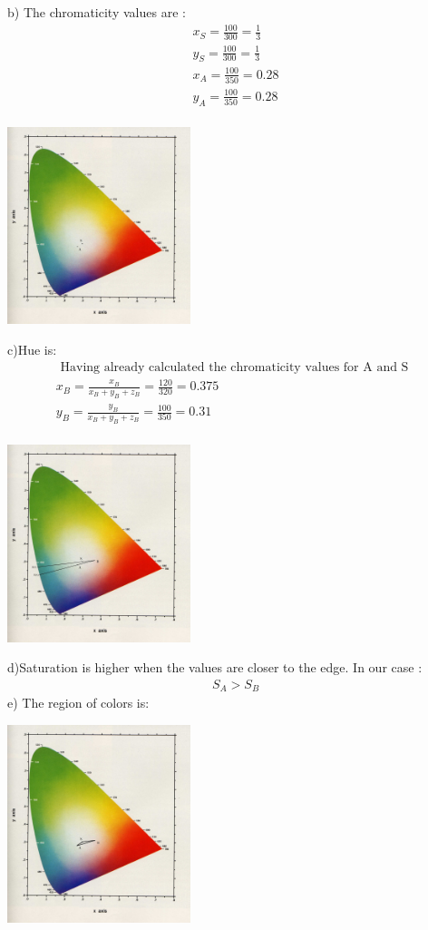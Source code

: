 \documentclass{article}
\begin{document}
b) The chromaticity values are :
\begin{gather}  
x_{S} = \frac{100}{300} = \frac{1}{3} \\
y_{S} = \frac{100}{300} = \frac{1}{3} \\
x_{A} = \frac{100}{350} = 0.28 \\
y_{A} = \frac{100}{350} = 0.28 \\
\end{gather}
\begin{center}
\includegraphics[width=0.4\textwidth]{b1.jpg} 
\end{center}
c)Hue is:
\begin{gather}  
\text{ Having already calculated the chromaticity values for A and S }\ \\
x_{B} = \frac{x_{B}}{x_{B}+y_{B}+z_{B}} = \frac{120}{320} = 0.375 \\
y_{B} = \frac{y_{B}}{x_{B}+y_{B}+z_{B}} = \frac{100}{350} = 0.31 \\
\end{gather}
\begin{center}
\includegraphics[width=0.4\textwidth]{c.jpg} 
\end{center}
d)Saturation is higher when the values are closer to the edge. In our case :
\begin{gather}  
S_{A} > S_{B}
\end{gather}
e) The region of colors is:
\begin{center}
\includegraphics[width=0.4\textwidth]{e.jpg} 
\end{center}
\end{document}
